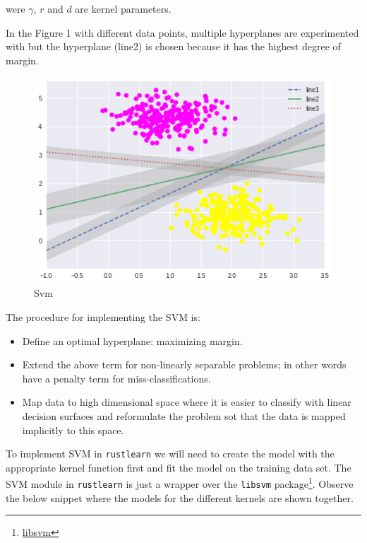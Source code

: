 \documentclass{book}
\begin{document}
were $\gamma$, $r$ and $d$ are kernel parameters\cite{svm}.

In the Figure 1 with different data points, multiple hyperplanes are experimented with but the hyperplane (line2) is chosen because it has the highest degree of margin.

\begin{figure}
	\centering
	\includegraphics[width=0.8\linewidth]{svm.png}
	\caption{Svm}
	\label{fig:svm}
\end{figure}

The procedure for implementing the SVM is:

\begin{itemize}
	\item Define an optimal hyperplane: maximizing margin.
	\item Extend the above term for non-linearly separable problems; in other words have a penalty term for miss-classifications.
	\item Map data to high dimensional space where it is easier to classify with linear decision surfaces and reformulate the problem sot that the data is mapped implicitly to this space.
\end{itemize}

To implement SVM in \lstinline{rustlearn} we will need to create the model with the appropriate kernel function first and fit the model on the training data set. The SVM module in \lstinline{rustlearn} is just a wrapper over the \lstinline{libsvm} package\footnote{\href{https://www.csie.ntu.edu.tw/~cjlin/libsvm/}{libsvm}}. Observe the below snippet where the models for the different kernels are shown together.
\end{document}
